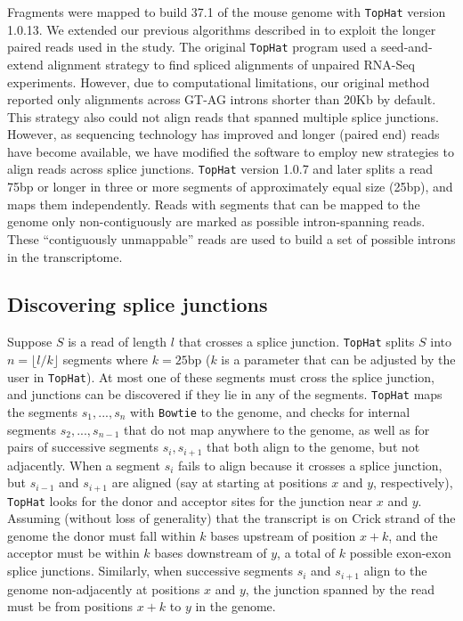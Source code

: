 \documentclass[12pt]{amsart}
\theoremstyle{definition}
\begin{document}
Fragments were mapped to build 37.1 of the mouse genome with {\tt TopHat} version
1.0.13. We extended our previous algorithms described in
\cite{Trapnell2009} to exploit the longer
paired reads used in the study. The original {\tt TopHat} program used a
seed-and-extend alignment strategy to find spliced alignments of unpaired
RNA-Seq experiments. However, due to computational limitations, our original
method reported only alignments across GT-AG introns shorter than 20Kb by
default. This strategy also could not align reads that spanned multiple splice
junctions. However, as sequencing technology has improved and longer (paired end) reads have 
become available, we have
modified the software to employ new strategies to align reads across splice
junctions. {\tt TopHat} version 1.0.7 and later splits a read 75bp or longer in
three or more segments of approximately equal size (25bp), and maps them
independently. Reads with segments that can be mapped to the genome only
non-contiguously are marked as possible intron-spanning reads. These
``contiguously unmappable'' reads are used to build a set of possible introns
in the transcriptome.

\subsection{Discovering splice junctions} Suppose $S$ is a read of length
$l$ that crosses a splice junction. {\tt TopHat} splits $S$ into $n=\lfloor
l/k \rfloor$ segments where $k=25$bp ($k$ is a parameter that can be
adjusted by the user in {\tt TopHat}). At most
one of these segments must cross the splice junction, and junctions
can be discovered if they lie in any of the segments. {\tt TopHat} maps the
segments $s_1,...,s_n$ with {\tt Bowtie} to the genome, and checks for
internal segments $s_2,...,s_{n-1}$ that do not map anywhere to the genome, as
well as for pairs of successive segments $s_i,s_{i+1}$ that both align to the
genome, but not adjacently. When a segment $s_i$ fails to align because it
crosses a splice junction, but $s_{i-1}$ and $s_{i+1}$ are aligned (say at
starting at positions $x$ and $y$, respectively), {\tt TopHat} looks for the
donor and acceptor sites for the junction near $x$ and $y$. Assuming
(without loss of generality)  that the
transcript is on Crick strand of the genome the
donor must fall within $k$ bases upstream of position $x+k$, and the acceptor
must be within $k$ bases downstream of $y$, a total of $k$ possible exon-exon
splice junctions. Similarly, when successive segments $s_i$ and $s_{i+1}$
align to the genome non-adjacently at positions $x$ and $y$, the junction
spanned by the read must be from positions $x+k$ to $y$ in the genome.
\end{document}
